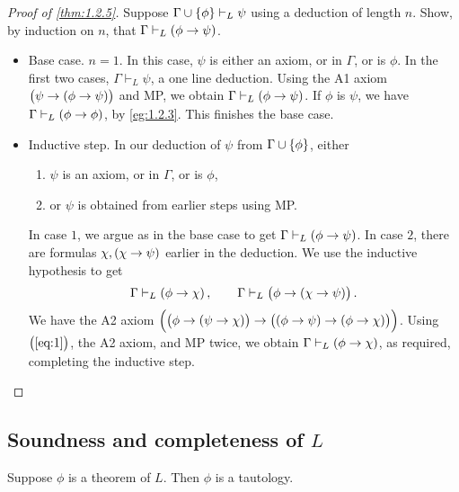 \begin{proof}[Proof of \ref{thm:1.2.5}]
Suppose $ \Gamma \cup \cbr{\phi} \vdash_L \psi $ using a deduction of length $ n $. Show, by induction on $ n $, that $ \Gamma \vdash_L \impb{\phi}{\psi} $.
\begin{itemize}
\item Base case. $ n = 1 $. In this case, $ \psi $ is either an axiom, or in $ \Gamma $, or is $ \phi $. In the first two cases, $ \Gamma \vdash_L \psi $, a one line deduction. Using the A1 axiom $ \impb{\psi}{\impb{\phi}{\psi}} $ and MP, we obtain $ \Gamma \vdash_L \impb{\phi}{\psi} $. If $ \phi $ is $ \psi $, we have $ \Gamma \vdash_L \impb{\phi}{\phi} $, by \ref{eg:1.2.3}. This finishes the base case.
\item Inductive step. In our deduction of $ \psi $ from $ \Gamma \cup \cbr{\phi} $, either
\begin{enumerate}[leftmargin=0.5in, label=Case \arabic*.]
\item $ \psi $ is an axiom, or in $ \Gamma $, or is $ \phi $,
\item or $ \psi $ is obtained from earlier steps using MP.
\end{enumerate}
In case $ 1 $, we argue as in the base case to get $ \Gamma \vdash_L \impb{\phi}{\psi} $. In case $ 2 $, there are formulas $ \chi, \impb{\chi}{\psi} $ earlier in the deduction. We use the inductive hypothesis to get
\begin{equation}
\label{eq:1}
\Gamma \vdash_L \impb{\phi}{\chi}, \qquad \Gamma \vdash_L \impb{\phi}{\impb{\chi}{\psi}}.
\end{equation}
We have the A2 axiom $ \impb{\impb{\phi}{\impb{\psi}{\chi}}}{\impb{\impb{\phi}{\psi}}{\impb{\phi}{\chi}}} $. Using $ \br{\ref{eq:1}} $, the A2 axiom, and MP twice, we obtain $ \Gamma \vdash_L \impb{\phi}{\chi} $, as required, completing the inductive step.
\end{itemize}
\end{proof}


\subsection{Soundness and completeness of $ L $}

\begin{theorem}[Soundness of $ L $]
\label{thm:1.3.1}
Suppose $ \phi $ is a theorem of $ L $. Then $ \phi $ is a tautology.
\end{theorem}

